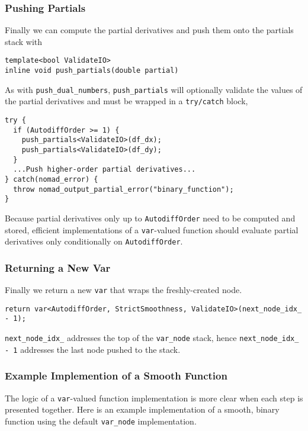 \subsubsection{Pushing Partials}

Finally we can compute the partial derivatives and push them onto the
partials stack with
%
\begin{verbatim}
template<bool ValidateIO>
inline void push_partials(double partial)
\end{verbatim}
%
As with \verb|push_dual_numbers|, \verb|push_partials| will optionally
validate the values of the partial derivatives and must be wrapped in
a \verb|try/catch| block,
%
\begin{verbatim}
try {
  if (AutodiffOrder >= 1) {
    push_partials<ValidateIO>(df_dx);
    push_partials<ValidateIO>(df_dy);
  }
  ...Push higher-order partial derivatives...
} catch(nomad_error) {
  throw nomad_output_partial_error("binary_function");
}
\end{verbatim}

Because partial derivatives only up to \verb|AutodiffOrder| need to be
computed and stored, efficient implementations of a \verb|var|-valued
function should evaluate partial derivatives only conditionally on
\verb|AutodiffOrder|.

\subsubsection{Returning a New Var}

Finally we return a new \verb|var| that wraps the freshly-created node.
%
\begin{verbatim}
return var<AutodiffOrder, StrictSmoothness, ValidateIO>(next_node_idx_ - 1);
\end{verbatim}
%
\verb|next_node_idx_| addresses the top of the \verb|var_node| stack, hence
\verb|next_node_idx_ - 1| addresses the last node pushed to the stack.

\subsubsection{Example Implemention of a Smooth Function}

The logic of a \verb|var|-valued function implementation is more clear
when each step is presented together.  Here is an example implementation
of a smooth, binary function using the default \verb|var_node| implementation.

